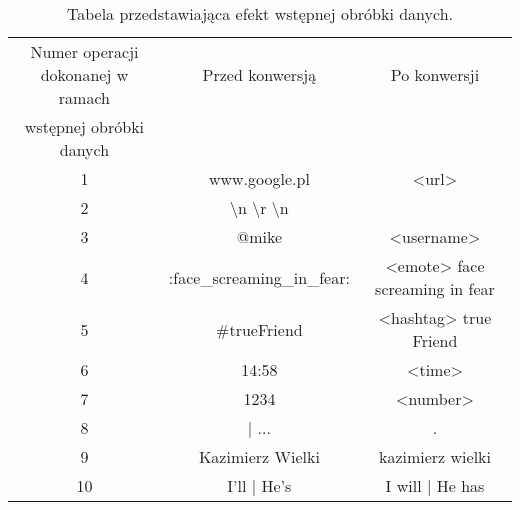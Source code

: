 \begin{table}[!h] \label{tab:tabela2} \centering
    \caption{Tabela przedstawiająca efekt wstępnej obróbki danych.}
    \begin{tabular} {| c | c | c |} \hline
        Numer operacji dokonanej w ramach & Przed konwersją                                          & Po konwersji                   \\
        wstępnej obróbki danych           &                                                          &                                \\ \hline\hline
        1                                 & www.google.pl                                            & <url>                          \\ \hline
        2                                 & \textbackslash n \quad \textbackslash r \textbackslash n &                                \\ \hline
        3                                 & @mike                                                    & <username>                     \\ \hline
        4                                 & :face\_screaming\_in\_fear:                              & <emote> face screaming in fear \\ \hline
        5                                 & \#trueFriend                                             & <hashtag> true Friend          \\ \hline
        6                                 & 14:58                                                    & <time>                         \\ \hline
        7                                 & 1234                                                     & <number>                       \\ \hline
        8                                 & | ...                                                    & .                              \\ \hline
        9                                 & Kazimierz Wielki                                         & kazimierz wielki               \\ \hline
        10                                & I'll \quad | \quad He's                                  & I will \quad | \quad He has    \\ \hline
    \end{tabular}
\end{table}

%




